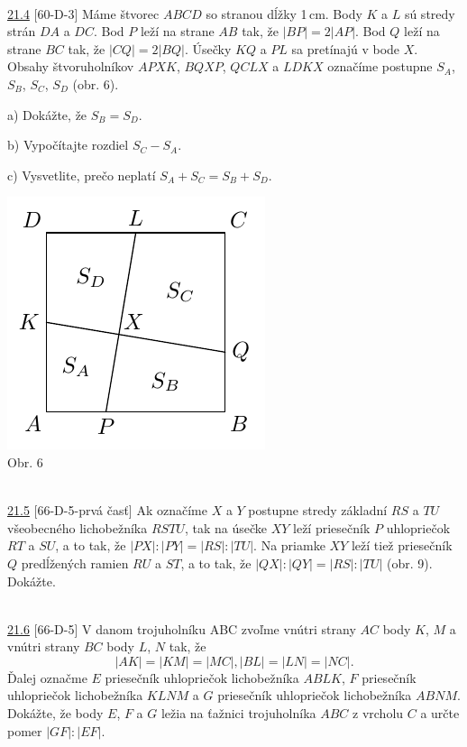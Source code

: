 \\

\noindent \ul{21.4} [60-D-3]  Máme štvorec $ABCD$ so stranou dĺžky 1\,cm. Body $K$ a $L$ sú stredy strán $DA$ a $DC$. Bod $P$ leží na strane $AB$ tak, že $| BP | = 2 | AP |$. Bod $Q$ leží na strane $BC$ tak, že $| CQ | = 2 | BQ |$. Úsečky $KQ$ a $PL$ sa pretínajú v bode $X$. Obsahy štvoruholníkov $APXK$, $BQXP$, $QCLX$ a $LDKX$ označíme postupne $S_A$, $S_B$, $S_C$, $S_D$ (obr. 6).

a) Dokážte, že $S_B = S_D$.

b) Vypočítajte rozdiel $S_C - S_A$.

c) Vysvetlite, prečo neplatí $S_A + S_C = S_B + S_D$.
\begin{center}
\includegraphics{obrazky/60D31}\\

Obr. 6
\end{center}

\\

\noindent \ul{21.5} [66-D-5-prvá časť] Ak označíme $X$ a $Y$ postupne stredy základní $RS$ a $TU$ všeobecného lichobežníka $RSTU$, tak na úsečke $XY$ leží priesečník $P$ uhlopriečok $RT$ a $SU$, a to tak, že $|PX| : |PY | = |RS| : |TU|$. Na priamke $XY$ leží tiež priesečník $Q$ predĺžených ramien $RU$ a $ST$, a to tak, že $|QX| : |QY | = |RS| : |TU|$ (obr. 9). Dokážte.


\\

\noindent \ul{21.6} [66-D-5] V danom trojuholníku ABC zvoľme vnútri strany $AC$ body $K$, $M$ a vnútri strany $BC$ body $L$, $N$ tak, že
$$|AK| = |KM| = |MC|, |BL| = |LN| = |NC|.$$
Ďalej označme $E$ priesečník uhlopriečok lichobežníka $ABLK$, $F$ priesečník uhlopriečok lichobežníka $KLNM$ a $G$ priesečník uhlopriečok lichobežníka $ABNM$. Dokážte, že body $E$, $F$ a $G$ ležia na ťažnici trojuholníka $ABC$ z vrcholu $C$ a určte pomer $|GF| : |EF|$.


